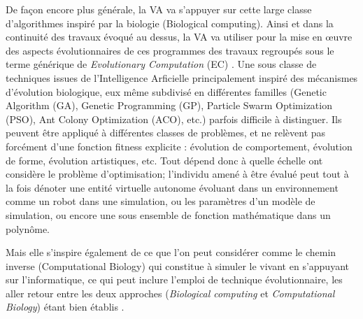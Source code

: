 De façon encore plus générale, la VA va s'appuyer sur cette large classe d'algorithmes inspiré par la biologie (Biological computing). Ainsi et dans la continuité des travaux évoqué au dessus, la VA va utiliser pour la mise en œuvre des aspects évolutionnaires de ces programmes des travaux regroupés sous le terme générique de \textit{Evolutionary Computation} (EC) \autocites{Back1997, Fogel1998, Fogel2006a}. Une sous classe de techniques issues de l'Intelligence Arficielle principalement inspiré des mécanismes d'évolution biologique, eux même subdivisé en différentes familles (Genetic Algorithm (GA), Genetic Programming (GP), Particle Swarm Optimization (PSO), Ant Colony Optimization (ACO), etc.) parfois difficile à distinguer. Ils peuvent être appliqué à différentes classes de problèmes, et ne relèvent pas forcément d'une fonction fitness explicite : évolution de comportement, évolution de forme, évolution artistiques, etc. Tout dépend donc à quelle échelle  ont considère le problème d'optimisation; l'individu amené à être évalué peut tout à la fois dénoter une entité virtuelle autonome évoluant dans un environnement comme un robot dans une simulation, ou les paramètres d'un modèle de simulation, ou encore une sous ensemble de fonction mathématique dans un polynôme.


Mais elle s'inspire également de ce que l'on peut considérer comme le chemin inverse (Computational Biology) qui constitue à simuler le vivant en s'appuyant sur l'informatique, ce qui peut inclure l'emploi de technique évolutionnaire, les aller retour entre les deux approches (\textit{Biological computing} et \textit{Computational Biology}) étant bien établis \autocite{Giavitto2002,Hogeweg1992} .



